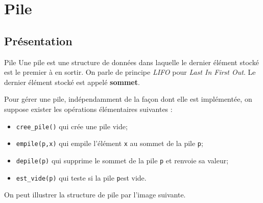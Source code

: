 \section{Pile}
\subsection{Présentation}
\begin{defi}{Pile}
Une pile est une structure de données dans laquelle le dernier élément stocké est le premier à en sortir. On parle de principe \textit{LIFO} pour \textit{Last In First Out}. Le dernier élément stocké est appelé \textbf{sommet}.
\end{defi}

Pour gérer une pile, indépendamment de la façon dont elle est implémentée, on suppose exister les opérations élémentaires suivantes : 
\begin{itemize}
\item \texttt{cree\_pile()} qui crée une pile vide;
\item \texttt{empile(p,x)} qui empile l'élément \texttt{x} au sommet de la pile \texttt{p};
\item \texttt{depile(p)} qui supprime le sommet de la pile \texttt{p} et renvoie sa valeur;
\item \texttt{est\_vide(p)} qui teste si la pile \texttt{p}est vide.
\end{itemize}

On peut illustrer la structure de pile par l'image suivante.

